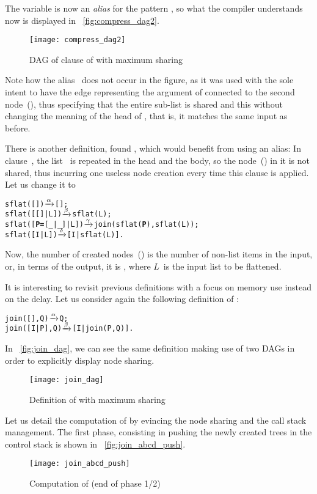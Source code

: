 The variable  is now an \emph{alias} for the pattern
\erlcode{[I|\_]}, so what the compiler understands now is displayed in
\fig~\vref{fig:compress_dag2}.
\begin{figure}
\centering
\texttt{[image: compress\_dag2]}
\caption{DAG of clause \clause{\beta} of
   with maximum sharing\label{fig:compress_dag2}}
\end{figure}
Note how the alias~ does not occur in the figure, as it was
used with the sole intent to have the edge representing the argument
of  connected to the second node~(\erlcode{|}),
thus specifying that the entire sub\hyp{}list is shared and this
without changing the meaning of the head of , that
is, it matches the same input as before.

There is another definition, found ,
which would benefit from using an alias: 
In clause~\clause{\gamma}, the list~\erlcode{[I|M]} is repeated in the
head and the body, so the node~(\erlcode{|}) in it is not shared, thus
incurring one useless node creation every time this clause is
applied. Let us change it to
\begin{alltt}
sflat(       [])   \(\smashedrightarrow{\alpha}\) [];
sflat(   [[]|L])   \(\smashedrightarrow{\beta}\) sflat(L);
sflat([\textbf{P=}[_|_]|L]) \(\smashedrightarrow{\gamma}\) join(sflat(\textbf{P}),sflat(L));\hfill% \emph{Alias} P
sflat(      [I|L]) \(\smashedrightarrow{\delta}\) [I|sflat(L)].
\end{alltt}
Now, the number of created nodes~(\erlcode{|}) is the number of
non\hyp{}list items in the input, or, in terms of the output, it is
, where \(L\)~is the input list to be
flattened.

It is interesting to revisit previous definitions with a focus on
memory use instead on the delay. Let us consider again the following
definition of :
\begin{alltt}
join(   [],Q) \(\smashedrightarrow{\alpha}\) Q;
join([I|P],Q) \(\smashedrightarrow{\beta}\) [I|join(P,Q)].
\end{alltt}
In \fig~\vref{fig:join_dag}, we can see the same definition making use
of two DAGs in order to explicitly display node sharing.
\begin{figure}[t]
\centering
\texttt{[image: join\_dag]}
\caption{Definition of  with maximum
sharing\label{fig:join_dag}}
\end{figure}
Let us detail the computation of  by
evincing the node sharing and the call stack management. The first
phase, consisting in pushing the newly created trees in the control
stack is shown in \fig~\vref{fig:join_abcd_push}.
\begin{figure}[h]
\centering
\texttt{[image: join\_abcd\_push]}
\caption{Computation of  (end of phase 1/2)
\label{fig:join_abcd_push}}
\end{figure}

